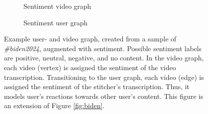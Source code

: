 \begin{figure}[H]
    \centering
    \begin{subfigure}{0.5\textwidth}
        \centering
        
        \caption{Sentiment video graph}
        \label{fig:biden_vgraph_sentiment}
    \end{subfigure}%
    \begin{subfigure}{0.5\textwidth}
        \centering
        
        \caption{Sentiment user graph}
        \label{fig:biden_ugraph_sentiment}
    \end{subfigure}
    \caption{Example user- and video graph, created from a sample of \textit{\#biden2024}, augmented with sentiment. Possible sentiment labels are \textcolor{SentimentPositive}{positive}, \textcolor{SentimentNeutral}{neutral}, \textcolor{SentimentNegative}{negative}, and \textcolor{SentimentMissing}{no content}. In the video graph, each video (vertex) is assigned the sentiment of the video transcription. Transitioning to the user graph, each video (edge) is assigned the sentiment of the stitcher's transcription. Thus, it models user's reactions towards other user's content. This figure is an extension of Figure \ref{fig:biden}.}
    \label{fig:biden_sentiment}
\end{figure}






